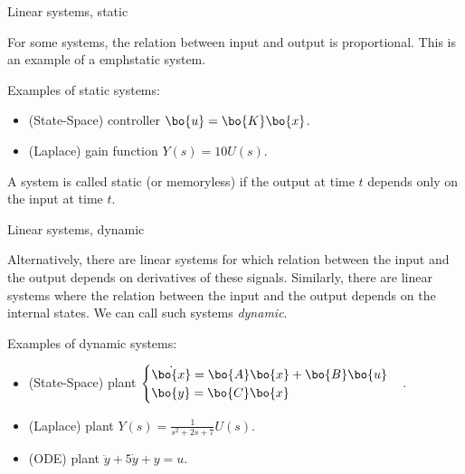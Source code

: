 \documentclass{beamer}
\begin{document}
\begin{frame}{Linear systems, static}
	\begin{flushleft}
		
		For some systems, the relation between input and output is proportional. This is an example of a emph{static} system.
		
		\bigskip
		
		Examples of static systems:
		
		\begin{itemize}
			\item (State-Space) controller $\bo{u} = \bo{K}\bo{x}$. 
			
			\item (Laplace) gain function $Y(s) = 10 U(s)$.
		\end{itemize}
		
		\begin{definition}
			A system is called static (or memoryless) if the output at time $t$ depends only on the input at time $t$.
		\end{definition}
		
	\end{flushleft}
\end{frame}


\begin{frame}{Linear systems, dynamic}
	\begin{flushleft}
		
		Alternatively, there are linear systems for which relation between the input and the output depends on derivatives of these signals. Similarly, there are linear systems where the relation between the input and the output  depends on the internal states. We can call such systems \emph{dynamic}.
		
		\bigskip
		
		Examples of dynamic systems:
		
		\begin{itemize}
			\item (State-Space) plant $\begin{cases}
				\dot {\bo{x}} = \bo{A} \bo{x} + \bo{B} \bo{u} \\
				\bo{y} = \bo{C} \bo{x}
			\end{cases}$.
			
			\item (Laplace) plant $Y(s) = \frac{1}{s^2 + 2s + 7} U(s)$.
			
			\item (ODE) plant $\ddot y + 5 \dot y + y = u$.
		\end{itemize}
		
	\end{flushleft}
\end{frame}
\end{document}
